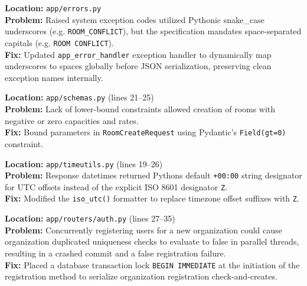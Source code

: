 \documentclass[11pt,a4paper]{article}
\begin{document}
\begin{tcolorbox}[colback=red!5!white,colframe=red!75!black,title=Bug 01: Error Response Code Formats (Spaces vs. Underscores)]
\textbf{Location:} \texttt{app/errors.py}\\
\textbf{Problem:} Raised system exception codes utilized Pythonic snake\_case underscores (e.g. \texttt{ROOM\_CONFLICT}), but the specification mandates space-separated capitals (e.g. \texttt{ROOM CONFLICT}).\\
\textbf{Fix:} Updated \texttt{app\_error\_handler} exception handler to dynamically map underscores to spaces globally before JSON serialization, preserving clean exception names internally.
\end{tcolorbox}

\begin{tcolorbox}[colback=yellow!5!white,colframe=yellow!75!black,title=Bug 02: Missing Validation for Room Capacity and Rates]
\textbf{Location:} \texttt{app/schemas.py} (lines 21--25)\\
\textbf{Problem:} Lack of lower-bound constraints allowed creation of rooms with negative or zero capacities and rates.\\
\textbf{Fix:} Bound parameters in \texttt{RoomCreateRequest} using Pydantic's \texttt{Field(gt=0)} constraint.
\end{tcolorbox}

\begin{tcolorbox}[colback=red!5!white,colframe=red!75!black,title=Bug 03: UTC Format Designator in Datetime Serialization]
\textbf{Location:} \texttt{app/timeutils.py} (lines 19--26)\\
\textbf{Problem:} Response datetimes returned Pythons default \texttt{+00:00} string designator for UTC offsets instead of the explicit ISO 8601 designator \texttt{Z}.\\
\textbf{Fix:} Modified the \texttt{iso\_utc()} formatter to replace timezone offset suffixes with \texttt{Z}.
\end{tcolorbox}

\begin{tcolorbox}[colback=red!5!white,colframe=red!75!black,title=Bug 04: Concurrency Race Condition in Registration]
\textbf{Location:} \texttt{app/routers/auth.py} (lines 27--35)\\
\textbf{Problem:} Concurrently registering users for a new organization could cause organization duplicated uniqueness checks to evaluate to false in parallel threads, resulting in a crashed commit and a false registration failure.\\
\textbf{Fix:} Placed a database transaction lock \texttt{BEGIN IMMEDIATE} at the initiation of the registration method to serialize organization registration check-and-creates.
\end{tcolorbox}
\end{document}

